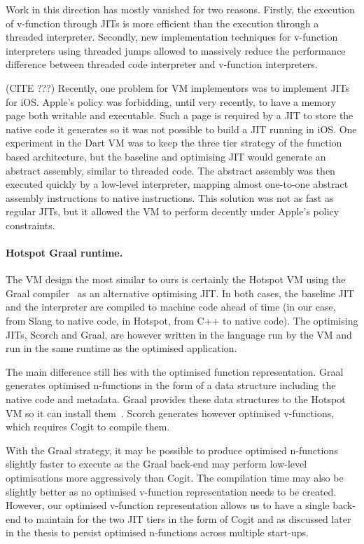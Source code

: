 \documentclass[a4paper,12pt,twoside]{../includes/ThesisStyle}
\begin{document}
Work in this direction has mostly vanished for two reasons. Firstly, the execution of v-function through JITs is more efficient than the execution through a threaded interpreter. Secondly, new implementation techniques for v-function interpreters using threaded jumps allowed to massively reduce the performance difference between threaded code interpreter and v-function interpreters.

(CITE ???)
Recently, one problem for VM implementors was to implement JITs for iOS. Apple's policy was forbidding, until very recently, to have a memory page both writable and executable. Such a page is required by a JIT to store the native code it generates so it was not possible to build a JIT running in iOS. One experiment in the Dart VM was to keep the three tier strategy of the function based architecture, but the baseline and optimising JIT would generate an abstract assembly, similar to threaded code. The abstract assembly was then executed quickly by a low-level interpreter, mapping almost one-to-one abstract assembly instructions to native instructions. This solution was not as fast as regular JITs, but it allowed the VM to perform decently under Apple's policy constraints.

\paragraph{Hotspot Graal runtime.}
The VM design the most similar to ours is certainly the Hotspot VM using the Graal compiler~\cite{Oracle13,Dubo13c} as an alternative optimising JIT. In both cases, the baseline JIT and the interpreter are compiled to machine code ahead of time (in our case, from Slang to native code, in Hotspot, from C++ to native code). The optimising JITs, Scorch and Graal, are however written in the language run by the VM and run in the same runtime as the optimised application. 

The main difference still lies with the optimised function representation. Graal generates optimised n-functions in the form of a data structure including the native code and metadata. Graal provides these data structures to the Hotspot VM so it can install them~\cite{Grim13a}. Scorch generates however optimised v-functions, which requires Cogit to compile them. 

With the Graal strategy, it may be possible to produce optimised n-functions slightly faster to execute as the Graal back-end may perform low-level optimisations more aggressively than Cogit. The compilation time may also be slightly better as no optimised v-function representation needs to be created. However, our optimised v-function representation allows us to have a single back-end to maintain for the two JIT tiers in the form of Cogit and as discussed later in the thesis to persist optimised n-functions across multiple start-ups.
\end{document}
